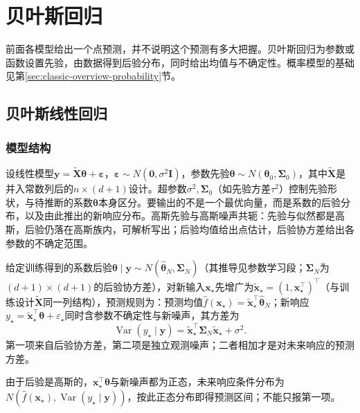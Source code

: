 \section{贝叶斯回归}
\label{sec:regression-bayesian}

前面各模型给出一个点预测，并不说明这个预测有多大把握。贝叶斯回归为参数或函数设置先验，由数据得到后验分布，同时给出均值与不确定性。概率模型的基础见第\ref{sec:classic-overview-probability}节。

\subsection{贝叶斯线性回归}
\label{sec:regression-bayesian-linear}

\subsubsection{模型结构}
\label{sec:regression-bayesian-linear-structure}

设线性模型$\bm{y}=\widetilde{\bm{X}}\bm{\theta}+\bm{\varepsilon}$，$\bm{\varepsilon}\sim N(\bm{0},\sigma^2\bm{I})$，参数先验$\bm{\theta}\sim N(\bm{\theta}_0,\bm{\Sigma}_0)$，其中$\widetilde{\bm{X}}$是并入常数列后的$n\times(d+1)$设计。超参数$\sigma^2,\bm{\Sigma}_0$（如先验方差$\tau^2$）控制先验形状，与待推断的系数$\bm{\theta}$本身区分。要输出的不是一个最优向量，而是系数的后验分布，以及由此推出的新响应分布。高斯先验与高斯噪声共轭：先验与似然都是高斯，后验仍落在高斯族内，可解析写出；后验均值给出点估计，后验协方差给出各参数的不确定范围。

给定训练得到的系数后验$\bm{\theta}\mid\bm{y}\sim N(\widehat{\bm{\theta}}_N,\bm{\Sigma}_N)$（其推导见参数学习段；$\bm{\Sigma}_N$为$(d+1)\times(d+1)$的后验协方差），对新输入$\bm{x}_\star$先增广为$\widetilde{\bm{x}}_\star=(1,\bm{x}_\star^{\top})^{\top}$（与训练设计$\widetilde{\bm{X}}$同一列结构），预测规则为：预测均值$\widehat f(\bm{x}_\star)=\widetilde{\bm{x}}_\star^{\top}\widehat{\bm{\theta}}_N$；新响应$y_\star=\widetilde{\bm{x}}_\star^{\top}\bm{\theta}+\varepsilon_\star$同时含参数不确定性与新噪声，其方差为
\[
  \operatorname{Var}(y_\star\mid\bm{y})
  =\widetilde{\bm{x}}_\star^{\top}\bm{\Sigma}_N\widetilde{\bm{x}}_\star+\sigma^2.
\]
第一项来自后验协方差，第二项是独立观测噪声；二者相加才是对未来响应的预测方差。

由于后验是高斯的，$\bm{x}_\star^{\top}\bm{\theta}$与新噪声都为正态，未来响应条件分布为$N(\widehat f(\bm{x}_\star),\operatorname{Var}(y_\star\mid\bm{y}))$，按此正态分布即得预测区间；不能只报第一项。

